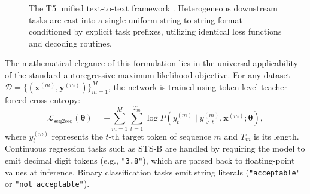 \documentclass[../../../main.tex]{subfiles}
\begin{document}
\begin{figure}[t]
\caption{The T5 unified text-to-text framework \cite{raffel2020t5}. Heterogeneous downstream tasks are cast into a single uniform string-to-string format conditioned by explicit task prefixes, utilizing identical loss functions and decoding routines.}
\label{fig:t5_architecture}
\end{figure}

The mathematical elegance of this formulation lies in the universal applicability of the standard autoregressive maximum-likelihood objective. For any dataset $\mathcal{D} = \{(\mathbf{x}^{(m)}, \mathbf{y}^{(m)})\}_{m=1}^M$, the network is trained using token-level teacher-forced cross-entropy:
\begin{equation}
\mathcal{L}_{\text{seq2seq}}(\boldsymbol{\theta}) = -\sum_{m=1}^M \sum_{t=1}^{T_m} \log P\left(y_t^{(m)} \mid y_{<t}^{(m)}, \mathbf{x}^{(m)}; \boldsymbol{\theta}\right),
\label{eq:t5_seq2seq_loss}
\end{equation}
where $y_t^{(m)}$ represents the $t$-th target token of sequence $m$ and $T_m$ is its length. Continuous regression tasks such as STS-B are handled by requiring the model to emit decimal digit tokens (e.g., \texttt{"3.8"}), which are parsed back to floating-point values at inference. Binary classification tasks emit string literals (\texttt{"acceptable"} or \texttt{"not acceptable"}).
\end{document}
